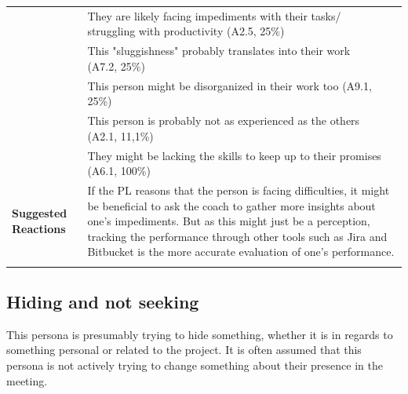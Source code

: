\begin{longtable}[ht]{ p{}  p{} p{} }
     & They are likely facing impediments with their tasks/ struggling with productivity (A2.5, 25\%) \\
     & This "sluggishness" probably translates into their work (A7.2, 25\%) \\
 	 & This person might be disorganized in their work too (A9.1, 25\%) \\
 	 & This person is probably not as experienced as the others  (A2.1, 11,1\%) \\
 	 & They might be lacking the skills to keep up to their promises (A6.1, 100\%) \\    
    \hline
     \textbf{Suggested Reactions} & \multicolumn{2}{p{.80\textwidth}}{ If the PL reasons that the person is facing difficulties, it might be beneficial to ask the coach to gather more insights about one's impediments. But as this might just be a perception, tracking the performance through other tools such as Jira and Bitbucket is the more accurate evaluation of one's performance. } \\
    \hline
\label{tab:multicol}
\end{longtable}

\subsection{Hiding and not seeking}

This persona is presumably trying to hide something, whether it is in regards to something personal or related to the project. It is often assumed that this persona is not actively trying to change something about their presence in the meeting.


